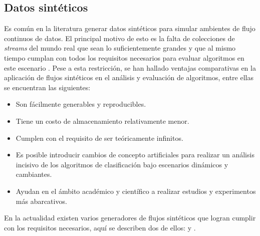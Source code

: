 \subsection{Datos sintéticos}

Es común en la literatura generar datos sintéticos para simular ambientes de
flujo continuos de datos. El principal motivo de esto es la falta de colecciones
de \textit{streams} del mundo real que sean lo suficientemente grandes y que al
mismo tiempo cumplan con todos los requisitos necesarios para evaluar algoritmos
en este escenario \cite{kirkby_improving_2007}. Pese a esta restricción, se han
hallado ventajas comparativas en la aplicación de flujos sintéticos en el
análisis y evaluación de algoritmos, entre ellas se encuentran las siguientes:

\begin{itemize} 

   \item Son fácilmente generables y reproducibles.

   \item Tiene un costo de almacenamiento relativamente menor.

   \item Cumplen con el requisito de ser teóricamente infinitos.

   \item Es posible introducir cambios de concepto artificiales para realizar un
      análisis incisivo de los algoritmos de clasificación bajo escenarios
      dinámicos y cambiantes.

   \item Ayudan en el ámbito académico y científico a realizar estudios y
      experimentos más abarcativos.

\end{itemize} 

En la actualidad existen varios generadores de flujos sintéticos que logran
cumplir con los requisitos necesarios, aquí se describen dos de ellos:
 y .

